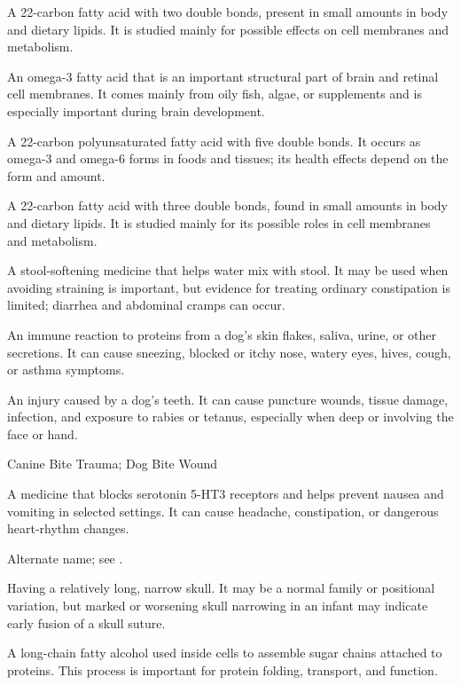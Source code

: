  A 22-carbon fatty acid with two double bonds, present in small amounts in body and dietary lipids. It is studied mainly for possible effects on cell membranes and metabolism.

 An omega-3 fatty acid that is an important structural part of brain and retinal cell membranes. It comes mainly from oily fish, algae, or supplements and is especially important during brain development.

 A 22-carbon polyunsaturated fatty acid with five double bonds. It occurs as omega-3 and omega-6 forms in foods and tissues; its health effects depend on the form and amount.

 A 22-carbon fatty acid with three double bonds, found in small amounts in body and dietary lipids. It is studied mainly for its possible roles in cell membranes and metabolism.

 A stool-softening medicine that helps water mix with stool. It may be used when avoiding straining is important, but evidence for treating ordinary constipation is limited; diarrhea and abdominal cramps can occur.

 An immune reaction to proteins from a dog’s skin flakes, saliva, urine, or other secretions. It can cause sneezing, blocked or itchy nose, watery eyes, hives, cough, or asthma symptoms.

 An injury caused by a dog’s teeth. It can cause puncture wounds, tissue damage, infection, and exposure to rabies or tetanus, especially when deep or involving the face or hand.

\synonyms
Canine Bite Trauma; Dog Bite Wound

 A medicine that blocks serotonin 5-HT3 receptors and helps prevent nausea and vomiting in selected settings. It can cause headache, constipation, or dangerous heart-rhythm changes.

 Alternate name; see .


 Having a relatively long, narrow skull. It may be a normal family or positional variation, but marked or worsening skull narrowing in an infant may indicate early fusion of a skull suture.

 A long-chain fatty alcohol used inside cells to assemble sugar chains attached to proteins. This process is important for protein folding, transport, and function.

